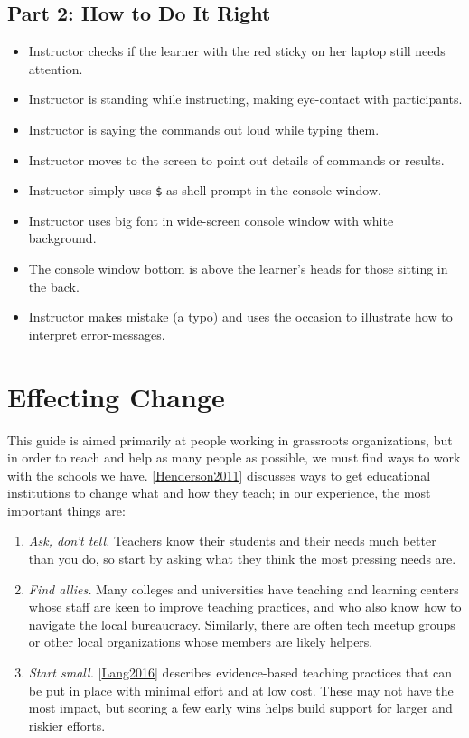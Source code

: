 \documentclass[10pt,statementpaper]{memoir}
\begin{document}
\subsection*{Part 2: How to Do It Right}\label{part-2-how-to-do-it-right}

\begin{itemize}
\item
  Instructor checks if the learner with the red sticky on her laptop
  still needs attention.
\item
  Instructor is standing while instructing, making eye-contact with
  participants.
\item
  Instructor is saying the commands out loud while typing them.
\item
  Instructor moves to the screen to point out details of commands or
  results.
\item
  Instructor simply uses \texttt{\$} as shell prompt in the console
  window.
\item
  Instructor uses big font in wide-screen console window with white
  background.
\item
  The console window bottom is above the learner's heads for those
  sitting in the back.
\item
  Instructor makes mistake (a typo) and uses the occasion to illustrate
  how to interpret error-messages.
\end{itemize}

\section{Effecting Change}\label{effecting-change}

This guide is aimed primarily at people working in grassroots
organizations, but in order to reach and help as many people as
possible, we must find ways to work with the schools we have.
{[}\href{biblio.html\#henderson-facilitating}{Henderson2011}{]}
discusses ways to get educational institutions to change what and how
they teach; in our experience, the most important things are:

\begin{enumerate}
\def\labelenumi{\arabic{enumi}.}
\item
  \emph{Ask, don't tell.} Teachers know their students and their needs
  much better than you do, so start by asking what they think the most
  pressing needs are.
\item
  \emph{Find allies.} Many colleges and universities have teaching and
  learning centers whose staff are keen to improve teaching practices,
  and who also know how to navigate the local bureaucracy. Similarly,
  there are often tech meetup groups or other local organizations whose
  members are likely helpers.
\item
  \emph{Start small.}
  {[}\href{biblio.html\#lang-small-teaching}{Lang2016}{]} describes
  evidence-based teaching practices that can be put in place with
  minimal effort and at low cost. These may not have the most impact,
  but scoring a few early wins helps build support for larger and
  riskier efforts.
\end{enumerate}
\end{document}
